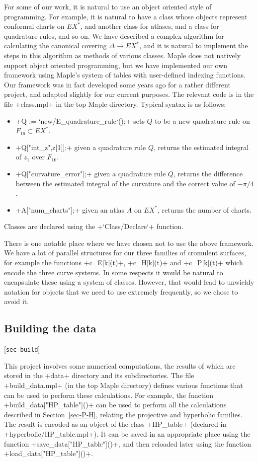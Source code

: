 \documentclass[reqno]{amsart}
\newcommand{\lbl}[1]{\label{#1}\textup{[\texttt{#1}]}\par}
\newcommand{\lbl}{\label}
\newcommand{\Dl}        {\Delta}
\renewcommand{\:}{\colon}
\theoremstyle{definition}
\begin{document}
For some of our work, it is natural to use an object oriented style of
programming.  For example, it is natural to have a class whose objects
represent conformal charts on $EX^*$, and another class for atlases,
and a class for quadrature rules, and so on.  We have described a
complex algorithm for calculating the canonical covering
$\Dl\to EX^*$, and it is natural to implement the steps in this
algorithm as methods of various classes.  Maple does not natively
support object oriented programming, but we have implemented our own
framework using Maple's system of tables with user-defined indexing
functions.  Our framework was in fact developed some years ago for a
rather different project, and adapted slightly for our current
purposes.  The relevant code is in the file \fname+class.mpl+ in the
top Maple directory.  Typical syntax is as follows:
\begin{itemize}
\item \mcode+Q := `new/E_quadrature_rule`();+ sets $Q$ to be a new
 quadrature rule on $F_{16}\subset EX^*$.
\item \mcode+Q["int_z",z[1]];+ given a quadrature rule $Q$,
 returns the estimated integral of $z_1$ over $F_{16}$.
\item \mcode+Q["curvature_error"];+ given a quadrature rule $Q$,
 returns the difference between the estimated integral of the
 curvature and the correct value of $-\pi/4$.
\item \mcode+A["num_charts"];+ given an atlas $A$ on $EX^*$, returns
 the number of charts.
\end{itemize}
Classes are declared using the \mcode+`Class/Declare`+ function.

There is one notable place where we have chosen not to use the above
framework.  We have a lot of parallel structures for our three
families of cromulent surfaces, for example the functions
\mcode+c_E[k](t)+, \mcode+c_H[k](t)+ and \mcode+c_P[k](t)+ which encode
the three curve systems.  In some respects it would be natural to
encapsulate these using a system of classes.  However, that would lead
to unwieldy notation for objects that we need to use extremely
frequently, so we chose to avoid it.

\subsection{Building the data}
\lbl{sec-build}

This project involves some numerical computations, the results of
which are stored in the \fname+data+ directory and its
subdirectories.  The file \fname+build_data.mpl+ (in the top Maple
directory) defines various functions that can be used to perform these
calculations.  For example, the function
\mcode+build_data["HP_table"]()+ can be used to perform all the
calculations described in Section~\ref{sec-P-H}, relating the
projective and hyperbolic families.  The result is encoded as an
object of the class \mcode+HP_table+ (declared in
\fname+hyperbolic/HP_table.mpl+).  It can be saved in an appropriate
place using the function \mcode+save_data["HP_table"]()+, and then
reloaded later using the function \mcode+load_data["HP_table"]()+.
\end{document}
